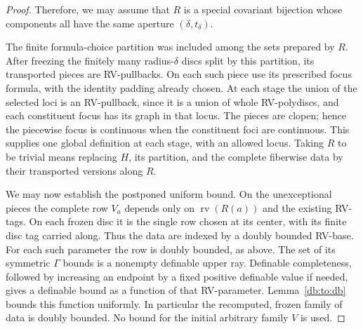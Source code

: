\documentclass[12pt]{amsart}
\theoremstyle{plain}
\theoremstyle{definition}
\theoremstyle{remark}
\newtheorem{ter}[thm]{Terminology}
\numberwithin{equation}{section}
\theoremstyle{plain}
\newcommand{\0}{\emptyset}
\DeclareMathOperator{\rv}{rv}
\begin{document}
\begin{proof}

Therefore, we may assume that $R$ is a special covariant bijection whose components all have the same  aperture $(\delta, t_{\delta})$.


The finite formula-choice partition was included among the sets prepared by $R$. After freezing the finitely many radius-$\delta$ discs split by this partition, its transported pieces are RV-pullbacks. On each such piece use its prescribed focus formula, with the identity padding already chosen. At each stage the union of the selected loci is an RV-pullback, since it is a union of whole RV-polydiscs, and each constituent focus has its graph in that locus. The pieces are clopen; hence the piecewise focus is continuous when the constituent foci are continuous. This supplies one global definition at each stage, with an allowed locus. Taking $R$ to be trivial means replacing $H$, its partition, and the complete fiberwise data by their transported versions along $R$.

We may now establish the postponed uniform bound. On the unexceptional pieces the complete row $V_a$ depends only on $\rv(R(a))$ and the existing RV-tags. On each frozen disc it is the single row chosen at its center, with its finite disc tag carried along. Thus the data are indexed by a doubly bounded RV-base. For each such parameter the row is doubly bounded, as above. The set of its symmetric $\Gamma$ bounds is a nonempty definable upper ray. Definable completeness, followed by increasing an endpoint by a fixed positive definable value if needed, gives a definable bound as a function of that RV-parameter. Lemma~\ref{db:to:db} bounds this function uniformly. In particular the recomputed, frozen family of data is doubly bounded. No bound for the initial arbitrary family $V$ is used.


\end{proof}
\end{document}
